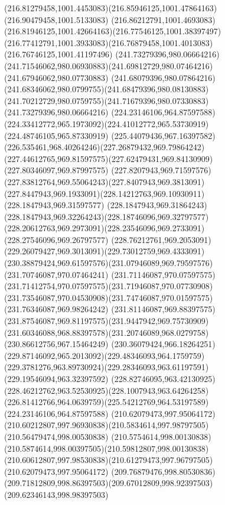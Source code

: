 {{		\curveto(216.81279458,1001.4453083)(216.85946125,1001.47864163)(216.90479458,1001.5133083)
		\curveto(216.86212791,1001.4693083)(216.81946125,1001.42664163)(216.77546125,1001.38397497)
		\curveto(216.77412791,1001.3933083)(216.76879458,1001.4013083)(216.76746125,1001.41197496)
		\moveto(241.73279396,980.06664216)
		\curveto(241.71546062,980.06930883)(241.69812729,980.07464216)(241.67946062,980.07730883)
		\curveto(241.68079396,980.07864216)(241.68346062,980.0799755)(241.68479396,980.08130883)
		\curveto(241.70212729,980.0759755)(241.71679396,980.07330883)(241.73279396,980.06664216)
		\moveto(224.23146106,964.87597588)
		\curveto(224.33412772,965.1973092)(224.41012772,965.53730919)(224.48746105,965.87330919)
		\curveto(225.44079436,967.16397582)(226.535461,968.40264246)(227.26879432,969.79864242)
		\curveto(227.44612765,969.81597575)(227.62479431,969.84130909)(227.80346097,969.87997575)
		\curveto(227.8207943,969.71597576)(227.83812764,969.55064243)(227.8407943,969.3813091)
		\curveto(227.8447943,969.1933091)(228.14212763,969.10930911)(228.1847943,969.31597577)
		\curveto(228.1847943,969.31864243)(228.1847943,969.32264243)(228.18746096,969.32797577)
		\curveto(228.20612763,969.2973091)(228.23546096,969.2733091)(228.27546096,969.26797577)
		\curveto(228.76212761,969.2053091)(229.26079427,969.3013091)(229.73012759,969.4333091)
		\curveto(230.38879424,969.61597576)(231.07946089,969.79597576)(231.70746087,970.07464241)
		\curveto(231.71146087,970.07597575)(231.71412754,970.07597575)(231.71946087,970.07730908)
		\curveto(231.73546087,970.04530908)(231.74746087,970.01597575)(231.76346087,969.98264242)
		\curveto(231.81146087,969.88397575)(231.87546087,969.81197575)(231.9447942,969.75730909)
		\curveto(231.60346088,968.88397578)(231.20746089,968.0279758)(230.86612756,967.15464249)
		\curveto(230.36079424,966.18264251)(229.87146092,965.2013092)(229.48346093,964.1759759)
		\curveto(229.3781276,963.89730924)(229.28346093,963.61197591)(229.19546094,963.32397592)
		\curveto(228.82746095,963.42130925)(228.46212762,963.52530925)(228.1007943,963.64264258)
		\curveto(226.81412766,964.0639759)(225.54212769,964.53197589)(224.23146106,964.87597588)
		\moveto(210.62079473,997.95064172)
		\curveto(210.60212807,997.96930838)(210.5834614,997.98797505)(210.56479474,998.00530838)
		\curveto(210.5754614,998.00130838)(210.5874614,998.00397505)(210.59812807,998.00130838)
		\curveto(210.60612807,997.98530838)(210.61279473,997.96797505)(210.62079473,997.95064172)
		\moveto(209.76879476,998.80530836)
		\curveto(209.71812809,998.86397503)(209.67012809,998.92397503)(209.62346143,998.98397503)
}}
